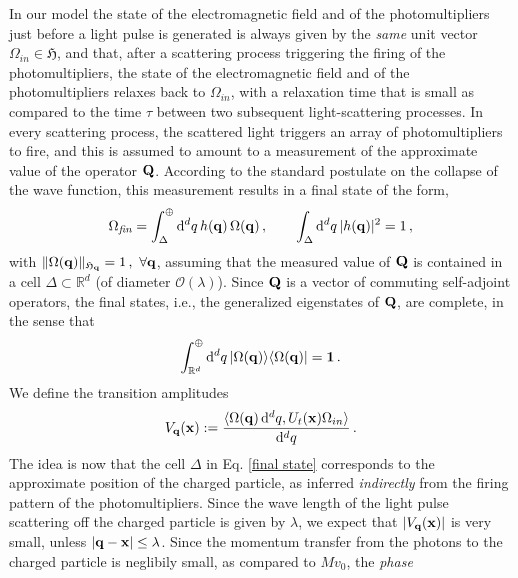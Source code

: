 \documentclass[12pt]{article}
\renewcommand{\d}{{\mathrm d}}
\begin{document}
In our model the state of the electromagnetic field and of the photomultipliers just before a light pulse is generated is 
always given by the \textit{same} unit vector $\Omega_{in} \in \mathfrak{H}$, and that, after a scattering process triggering the 
firing of the photomultipliers, the state of the electromagnetic field and of the photomultipliers relaxes back to $\Omega_{in}$, 
with a relaxation time that is small as compared to the time $\tau$ between two subsequent light-scattering processes. 
In every scattering process, the scattered light triggers an array of photomultipliers to fire, and this is assumed to amount 
to a measurement of the approximate value of the operator ${\bf{Q}}$. 
According to the standard postulate on the collapse of the wave function, this measurement results in a final state of the form, 
 \begin{equation}\label{final state}
 \Omega_{\textit{fin}} = \int_{\Delta}^{\oplus} \d^{d}{q} \, h(\mathbf{q})\, \Omega({\bf{q}})\,,  \qquad \int_{\Delta} \d^{d}q\,\vert h(\mathbf{q})\vert^{2} =1\,,
 \end{equation}
with $ \Vert \Omega({\bf{q}}) \Vert_{\mathfrak{H}_{{\bf{q}}}} = 1\,, \,\,\forall {\bf{q}}$, assuming that the measured 
value of ${\bf{Q}}$ is contained in a cell $\Delta \subset \mathbb{R}^{d}$ (of diameter 
$\mathcal{O}(\lambda)$). Since ${\bf{Q}}$ is a vector of commuting self-adjoint operators, the final states, i.e., 
the generalized eigenstates of ${\bf{Q}}$, are complete, in the sense that
\begin{equation}\label{completeness-1}
\int_{\mathbb{R}^{d}}^{\oplus} \d^{d}q\, \vert \Omega({\bf{q}})\rangle \langle\Omega({\bf{q}})\vert  = {\bf{1}}\,.
\end{equation}
We define the transition amplitudes
\begin{equation}\label{trans ampl}
 V_{\bf{q}} (\mathbf{x}):= \frac{\langle \Omega({\bf{q}})\,\d^{d}{q}, U_{t}({\bf{x}}) \Omega_{in}\rangle}{\d^{d}{q}} \,.
 \end{equation}
The idea is now that the cell $\Delta$ in Eq. \eqref{final state} corresponds to the approximate position of the charged particle, as inferred \textit{indirectly} from the firing pattern of the photomultipliers. Since the wave length of the light pulse scattering off the charged particle is given by 
$\lambda$, we expect that $\vert V_{\bf{q}} ({\bf{x}}) \vert$ is very small, unless $\vert {\bf{q}}-{\bf{x}} \vert \leq \lambda$. Since the momentum transfer from the photons to the charged particle is neglibily small, as compared to $Mv_0$, the \textit{phase} 
\end{document}

